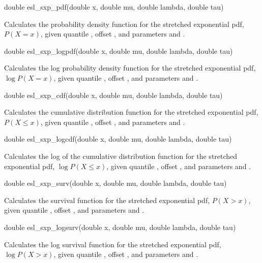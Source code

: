 \begin{sreapi}
\hypertarget{func:esl_sxp_pdf()}
{\item[double esl\_sxp\_pdf(double x, double mu, double lambda, double tau)]}

Calculates the probability density function for the 
stretched exponential pdf, $P(X=x)$, given
quantile , offset , and parameters  and .


\hypertarget{func:esl_sxp_logpdf()}
{\item[double esl\_sxp\_logpdf(double x, double mu, double lambda, double tau)]}

Calculates the log probability density function for the 
stretched exponential pdf, $\log P(X=x)$, given
quantile , offset , and parameters  and .


\hypertarget{func:esl_sxp_cdf()}
{\item[double esl\_sxp\_cdf(double x, double mu, double lambda, double tau)]}

Calculates the cumulative distribution function for the 
stretched exponential pdf, $P(X \leq x)$, given
quantile , offset , and parameters  and .


\hypertarget{func:esl_sxp_logcdf()}
{\item[double esl\_sxp\_logcdf(double x, double mu, double lambda, double tau)]}

Calculates the log of the cumulative distribution function for the 
stretched exponential pdf, $\log P(X \leq x)$, given
quantile , offset , and parameters  and .


\hypertarget{func:esl_sxp_surv()}
{\item[double esl\_sxp\_surv(double x, double mu, double lambda, double tau)]}

Calculates the survival function for the 
stretched exponential pdf, $P(X > x)$, given
quantile , offset , and parameters  and .


\hypertarget{func:esl_sxp_logsurv()}
{\item[double esl\_sxp\_logsurv(double x, double mu, double lambda, double tau)]}

Calculates the log survival function for the 
stretched exponential pdf, $\log P(X > x)$, given
quantile , offset , and parameters  and .



\end{sreapi}
